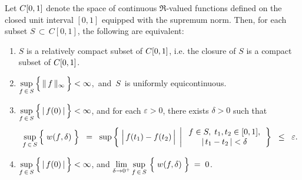 \begin{theorem}
\label{BillingsleyArzelaAscoli}
\mbox{}\vskip 0.1cm
\noindent
Let $C[0,1]$ denote the space of continuous $\Re$-valued functions
defined on the closed unit interval $[0,1]$ equipped with the supremum norm.
Then, for each subset $S \,\subset\, C[0,1]$, the following are equivalent:
\begin{enumerate}
\item	$S$ is a relatively compact subset of $C[0,1]$, i.e. the closure of $S$ is a compact subset of $C[0,1]$.
\item	$\underset{f\,\in\,S}{\sup}\left\{\,\Vert\,\overset{{\color{white}.}}{f}\,\Vert_{\infty}\,\right\} < \infty$,\,
		and \,$S$\, is uniformly equicontinuous.
\item	$\underset{f\,\in\,S}{\sup}\left\{\,\vert\,\overset{{\color{white}.}}{f}(0)\,\vert\,\right\} < \infty$, and
		for each $\varepsilon > 0$, there exists $\delta > 0$ such that
		\begin{equation*}
		\underset{f\,\in\,S}{\sup}\left\{\;w(\overset{{\color{white}.}}{f},\delta)\;\right\}
		\;\;=\;\;
		\sup\left\{\;
			\left\vert\,\overset{{\color{white}.}}{f}(t_{1}) - f(t_{2})\,\right\vert
			\;\left\vert\;
			\begin{array}{c} f \in S, \; t_{1},t_{2} \in [0,1], \\ \vert\,t_{1} - t_{2}\,\vert < \delta \end{array}
			\right.
		\right\}
		\;\;\leq\;\; \varepsilon.
		\end{equation*}
\item	$\underset{f\,\in\,S}{\sup}\left\{\,\vert\,\overset{{\color{white}.}}{f}(0)\,\vert\,\right\} < \infty$,
		\;and\;\;
		$\underset{\delta\rightarrow 0^{+}}{\lim}\,\underset{f\,\in\,S}{\sup}\,\left\{\;\overset{{\color{white}:}}{w}(f,\delta)\;\right\}\;=\;0$.
\end{enumerate}
\end{theorem}
